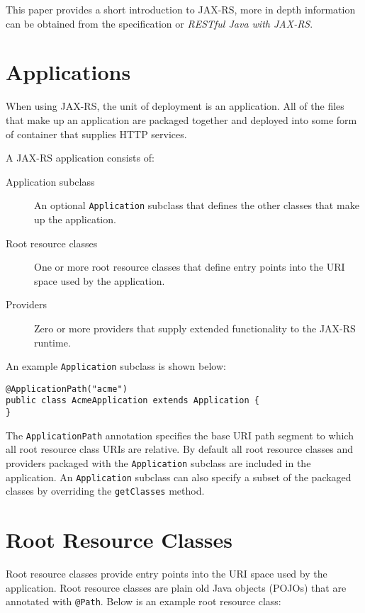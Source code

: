 \documentclass{acm_proc_article-sp}
\begin{document}
This paper provides a short introduction to JAX-RS, more in depth information can be obtained from the specification\cite{jaxrs11} or \textit{RESTful Java with JAX-RS}\cite{burke:restfuljava}.

\section{Applications}

When using JAX-RS, the unit of deployment is an application. All of the files that make up an application are packaged together and deployed into some form of container that supplies HTTP services.

A JAX-RS application consists of:

\begin{description}
\item[Application subclass] An optional \texttt{Application} subclass that defines the other classes that make up the application.
\item[Root resource classes] One or more root resource classes that define entry points into the URI space used by the application.
\item[Providers] Zero or more providers that supply extended functionality to the JAX-RS runtime.
\end{description}

An example \texttt{Application} subclass is shown below:

\begin{verbatim}
@ApplicationPath("acme")
public class AcmeApplication extends Application {
}
\end{verbatim}

The \texttt{ApplicationPath} annotation specifies the base URI path segment to which all root resource class URIs are relative. By default all root resource classes and providers packaged with the \texttt{Application} subclass are included in the application. An \texttt{Application} subclass can also specify a subset of the packaged classes by overriding the \texttt{getClasses} method.

\section{Root Resource Classes}

Root resource classes provide entry points into the URI space used by the application. Root resource classes are plain old Java objects (POJOs) that are annotated with \texttt{@Path}. Below is an example root resource class:
\end{document}
